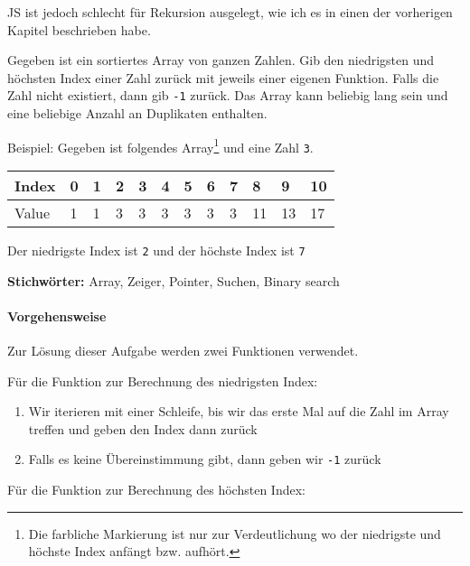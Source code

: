 \documentclass[babel]{book}
\begin{document}
JS ist jedoch schlecht für Rekursion ausgelegt, wie ich es in einen der vorherigen Kapitel beschrieben habe.

\begin{examplei}
	Gegeben ist ein sortiertes Array von ganzen Zahlen. Gib den niedrigsten und höchsten Index einer Zahl zurück mit jeweils einer eigenen Funktion. Falls die Zahl nicht existiert, dann gib \lstinline|-1| zurück. Das Array kann beliebig lang sein und eine beliebige Anzahl an Duplikaten enthalten.
	
	Beispiel:
	Gegeben ist folgendes Array\footnote{Die farbliche Markierung ist nur zur Verdeutlichung wo der niedrigste und höchste Index anfängt bzw. aufhört.} und eine Zahl \lstinline|3|. 	
	
	\begin{tabular}{|l|l|l|l|l|l|l|l|l|l|l|l|} 
		\hline
		\cellcolor{gray!25}Index & 0 & 1 & \cellcolor{red!25}2 & \cellcolor{yellow!25}3 & \cellcolor{yellow!25}4 & \cellcolor{yellow!25}5 & \cellcolor{yellow!25}6 & \cellcolor{red!25}7 & 8 & 9 & 10\\
		\hline
		\cellcolor{gray!25}Value & 1 & 1 & \cellcolor{blue!25}3 & \cellcolor{blue!25}3 & \cellcolor{blue!25}3 & \cellcolor{blue!25}3 & \cellcolor{blue!25}3 & \cellcolor{blue!25}3 & 11 & 13 & 17\\
		\hline
	\end{tabular}
	
	Der niedrigste Index ist \lstinline|2| und der höchste Index ist \lstinline|7|
\end{examplei}
{\bf Stichwörter:} Array, Zeiger, Pointer, Suchen, Binary search

\paragraph{Vorgehensweise} Zur Lösung dieser Aufgabe werden zwei Funktionen verwendet.

Für die Funktion zur Berechnung des niedrigsten Index:
\begin{enumerate} 
	\item Wir iterieren mit einer Schleife, bis wir das erste Mal auf die Zahl im Array treffen und geben den Index dann zurück
	\item Falls es keine Übereinstimmung gibt, dann geben wir \lstinline|-1| zurück
\end{enumerate}

Für die Funktion zur Berechnung des höchsten Index:
\end{document}
